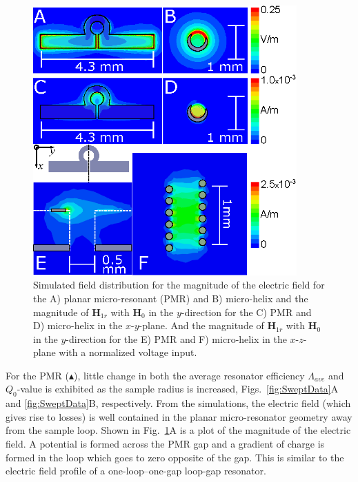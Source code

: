 \begin{figure}[htb]
 \centering
 \includegraphics[width=0.9\textwidth]{Kapitel/Ch2-Images/Ch2-AnsysFields.eps}
 \caption[Simulated field distribution for Helix and PMR.]{Simulated field distribution for the magnitude of the electric field for the A) planar micro-resonant (PMR) and B) micro-helix and the magnitude of $\mathbf{H}_{1r}$ with $\mathbf{H}_0$ in the $y$-direction for the C) PMR and D) micro-helix in the $x$-$y$-plane. And the magnitude of $\mathbf{H}_{1r}$ with $\mathbf{H}_0$ in the $y$-direction for the E) PMR and F) micro-helix in the $x$-$z$-plane with a normalized voltage input. }
 \label{ch2-fig:FieldData}
\end{figure}

For the PMR ($\blacktriangle$), little change in both the average resonator efficiency $\Lambda_{ave}$ and $Q_0$-value is exhibited as the sample radius is increased, Figs.~\ref{fig:SweptData}A and \ref{fig:SweptData}B, respectively. From the simulations, the electric field (which gives rise to losses) is well contained in the planar micro-resonator geometry away from the sample loop. Shown in Fig.~\ref{ch2-fig:FieldData}A is a plot of the magnitude of the electric field. A potential is formed across the PMR gap and a gradient of charge is formed in the loop which goes to zero opposite of the gap. This is similar to the electric field profile of a one-loop--one-gap loop-gap resonator.

